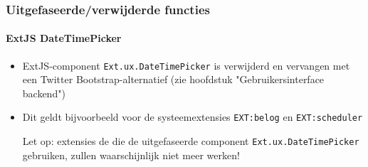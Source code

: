 
\begin{frame}[fragile]
	\frametitle{Uitgefaseerde/verwijderde functies}
	\framesubtitle{ExtJS DateTimePicker}

	\begin{itemize}

		\item ExtJS-component \texttt{Ext.ux.DateTimePicker} is verwijderd en vervangen met 
			een Twitter Bootstrap-alternatief (zie hoofdstuk "Gebruikersinterface backend")

		\item Dit geldt bijvoorbeeld voor de systeemextensies \texttt{EXT:belog} en
			\texttt{EXT:scheduler} 

			\vspace{0.2cm}

			\begingroup
				\color{red}
					Let op: extensies de die de uitgefaseerde component
					\texttt{Ext.ux.DateTimePicker} gebruiken, zullen waarschijnlijk niet meer werken!
			\endgroup

	\end{itemize}

\end{frame}


